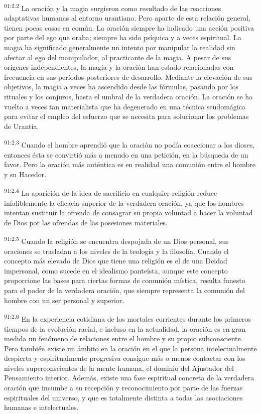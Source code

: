 \documentclass[twoside, 11pt]{book}
\begin{document}
\par
\textsuperscript{91:2.2} La oración y la magia surgieron como resultado de las reacciones adaptativas humanas al entorno urantiano. Pero aparte de esta relación general, tienen pocas cosas en común. La oración siempre ha indicado una acción positiva por parte del ego que oraba; siempre ha sido psíquica y a veces espiritual. La magia ha significado generalmente un intento por manipular la realidad sin afectar al ego del manipulador, al practicante de la magia. A pesar de sus orígenes independientes, la magia y la oración han estado relacionadas con frecuencia en sus períodos posteriores de desarrollo. Mediante la elevación de sus objetivos, la magia a veces ha ascendido desde las fórmulas, pasando por los rituales y los conjuros, hasta el umbral de la verdadera oración. La oración se ha vuelto a veces tan materialista que ha degenerado en una técnica seudomágica para evitar el empleo del esfuerzo que se necesita para solucionar los problemas de Urantia.

\par
\textsuperscript{91:2.3} Cuando el hombre aprendió que la oración no podía coaccionar a los dioses, entonces ésta se convirtió más a menudo en una petición, en la búsqueda de un favor. Pero la oración más auténtica es en realidad una comunión entre el hombre y su Hacedor.

\par
\textsuperscript{91:2.4} La aparición de la idea de sacrificio en cualquier religión reduce infaliblemente la eficacia superior de la verdadera oración, ya que los hombres intentan sustituir la ofrenda de consagrar su propia voluntad a hacer la voluntad de Dios por las ofrendas de las posesiones materiales.

\par
\textsuperscript{91:2.5} Cuando la religión se encuentra despojada de un Dios personal, sus oraciones se trasladan a los niveles de la teología y la filosofía. Cuando el concepto más elevado de Dios que tiene una religión es el de una Deidad impersonal, como sucede en el idealismo panteísta, aunque este concepto proporcione las bases para ciertas formas de comunión mística, resulta funesto para el poder de la verdadera oración, que siempre representa la comunión del hombre con un ser personal y superior.

\par
\textsuperscript{91:2.6} En la experiencia cotidiana de los mortales corrientes durante los primeros tiempos de la evolución racial, e incluso en la actualidad, la oración es en gran medida un fenómeno de relaciones entre el hombre y su propio subconsciente. Pero también existe un ámbito en la oración en el que la persona intelectualmente despierta y espiritualmente progresiva consigue más o menos contactar con los niveles superconscientes de la mente humana, el dominio del Ajustador del Pensamiento interior. Además, existe una fase espiritual concreta de la verdadera oración que incumbe a su recepción y reconocimiento por parte de las fuerzas espirituales del universo, y que es totalmente distinta a todas las asociaciones humanas e intelectuales.
\end{document}
